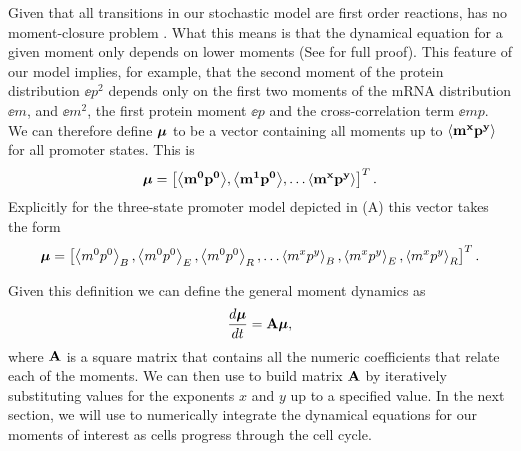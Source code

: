 Given that all transitions in our stochastic model are first order reactions,
 has no moment-closure problem \cite{Voliotis2014a}. What this
means is that the dynamical equation for a given moment only depends on lower
moments (See  for full proof). This feature of our model
implies, for example, that the second moment of the protein distribution
$\ee{p^2}$ depends only on the first two moments of the mRNA distribution
$\ee{m}$, and $\ee{m^2}$, the first protein moment $\ee{p}$  and the
cross-correlation term $\ee{mp}$. We can therefore define $\boldsymbol{\mu}$ to be a
vector containing all moments up to $\mathbf{\left\langle m^x p^y \right\rangle}$ for all promoter states.
This is
\begin{equation}
\boldsymbol{\mu} = \left[ \mathbf{\left\langle m^0 p^0 \right\rangle},
							\mathbf{\left\langle m^1 p^0 \right\rangle},
							\ldots \mathbf{\left\langle m^x p^y \right\rangle} \right]^T.
\end{equation}
Explicitly for the three-state promoter model depicted in
(A) this vector takes the form
\begin{equation}
	\boldsymbol{\mu} = \left[ \left\langle m^0 p^0 \right\rangle_B, \left\langle m^0 p^0 \right\rangle_E, \left\langle m^0 p^0 \right\rangle_R,
	\ldots \left\langle m^x p^y \right\rangle_B, \left\langle m^x p^y \right\rangle_E, \left\langle m^x p^y \right\rangle_R \right]^T.
\end{equation}

Given this definition we can define the general moment dynamics as
\begin{equation}
{d{\boldsymbol{\mu}} \over dt} = \mathbf{A} \boldsymbol{\mu},
\label{eq_mom_dynamics}
\end{equation}
where $\mathbf{A}$ is a square matrix that contains all the numeric coefficients
that relate each of the moments. We can then use  to build
matrix $\mathbf{A}$ by iteratively substituting values for the exponents $x$ and $y$
up to a specified value. In the next section, we will use 
to numerically integrate the dynamical equations for our moments of interest as
cells progress through the cell cycle.
